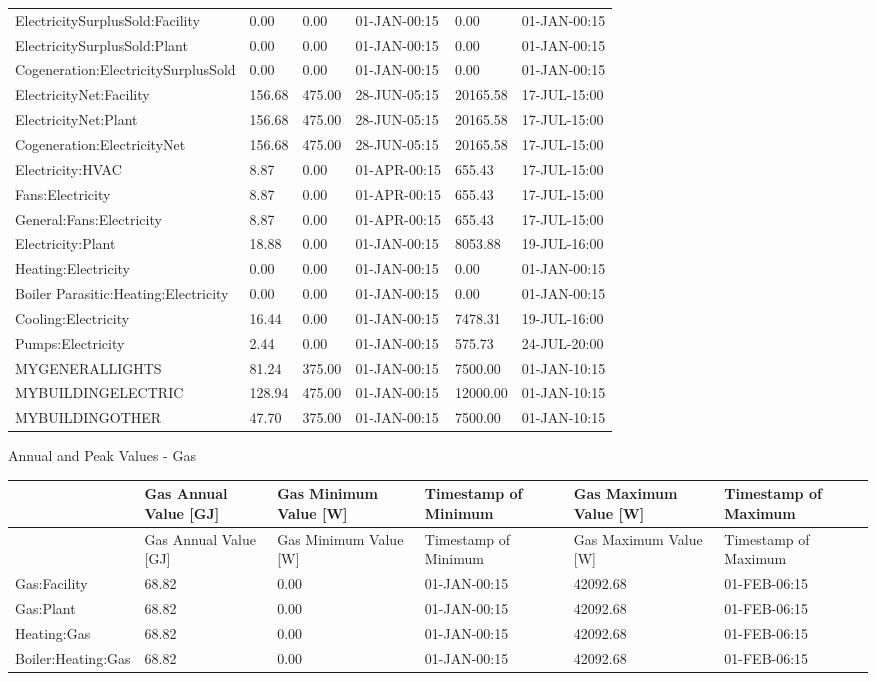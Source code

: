 {\begin{longtable}[c]{>{\raggedright}p{1.5in}>{\raggedright}p{0.9in}>{\raggedright}p{0.9in}>{\raggedright}p{0.9in}>{\raggedright}p{0.9in}>{\raggedright}p{0.9in}}
ElectricitySurplusSold\-:Facility & 0.00 & 0.00 & 01-JAN-00\-:15 & 0.00 & 01-JAN-00\-:15 \tabularnewline
ElectricitySurplusSold\-:Plant & 0.00 & 0.00 & 01-JAN-00\-:15 & 0.00 & 01-JAN-00\-:15 \tabularnewline
Cogeneration\-:ElectricitySurplusSold & 0.00 & 0.00 & 01-JAN-00\-:15 & 0.00 & 01-JAN-00\-:15 \tabularnewline
ElectricityNet\-:Facility & 156.68 & 475.00 & 28-JUN-05\-:15 & 20165.58 & 17-JUL-15\-:00 \tabularnewline
ElectricityNet\-:Plant & 156.68 & 475.00 & 28-JUN-05\-:15 & 20165.58 & 17-JUL-15\-:00 \tabularnewline
Cogeneration\-:ElectricityNet & 156.68 & 475.00 & 28-JUN-05\-:15 & 20165.58 & 17-JUL-15\-:00 \tabularnewline
Electricity\-:HVAC & 8.87 & 0.00 & 01-APR-00\-:15 & 655.43 & 17-JUL-15\-:00 \tabularnewline
Fans\-:Electricity & 8.87 & 0.00 & 01-APR-00\-:15 & 655.43 & 17-JUL-15\-:00 \tabularnewline
General\-:Fans\-:Electricity & 8.87 & 0.00 & 01-APR-00\-:15 & 655.43 & 17-JUL-15\-:00 \tabularnewline
Electricity\-:Plant & 18.88 & 0.00 & 01-JAN-00\-:15 & 8053.88 & 19-JUL-16\-:00 \tabularnewline
Heating\-:Electricity & 0.00 & 0.00 & 01-JAN-00\-:15 & 0.00 & 01-JAN-00\-:15 \tabularnewline
Boiler Parasitic\-:Heating\-:Electricity & 0.00 & 0.00 & 01-JAN-00\-:15 & 0.00 & 01-JAN-00\-:15 \tabularnewline
Cooling\-:Electricity & 16.44 & 0.00 & 01-JAN-00\-:15 & 7478.31 & 19-JUL-16\-:00 \tabularnewline
Pumps\-:Electricity & 2.44 & 0.00 & 01-JAN-00\-:15 & 575.73 & 24-JUL-20\-:00 \tabularnewline
MYGENERALLIGHTS & 81.24 & 375.00 & 01-JAN-00\-:15 & 7500.00 & 01-JAN-10\-:15 \tabularnewline
MYBUILDINGELECTRIC & 128.94 & 475.00 & 01-JAN-00\-:15 & 12000.00 & 01-JAN-10\-:15 \tabularnewline
MYBUILDINGOTHER & 47.70 & 375.00 & 01-JAN-00\-:15 & 7500.00 & 01-JAN-10\-:15 \tabularnewline
\bottomrule
\end{longtable}}

Annual and Peak Values - Gas

{\scriptsize
\begin{longtable}[c]{>{\raggedright}p{1.0in}>{\raggedright}p{1.0in}>{\raggedright}p{1.0in}>{\raggedright}p{1.0in}>{\raggedright}p{1.0in}>{\raggedright}p{1.0in}}
\toprule
 & Gas Annual Value [GJ] & Gas Minimum Value [W] & Timestamp of Minimum & Gas Maximum Value [W] & Timestamp of Maximum \tabularnewline
\midrule
\endfirsthead

\toprule
 & Gas Annual Value [GJ] & Gas Minimum Value [W] & Timestamp of Minimum & Gas Maximum Value [W] & Timestamp of Maximum \tabularnewline
\midrule
\endhead

Gas\-:Facility & 68.82 & 0.00 & 01-JAN-00\-:15 & 42092.68 & 01-FEB-06\-:15 \tabularnewline
Gas\-:Plant & 68.82 & 0.00 & 01-JAN-00\-:15 & 42092.68 & 01-FEB-06\-:15 \tabularnewline
Heating\-:Gas & 68.82 & 0.00 & 01-JAN-00\-:15 & 42092.68 & 01-FEB-06\-:15 \tabularnewline
Boiler\-:Heating\-:Gas & 68.82 & 0.00 & 01-JAN-00\-:15 & 42092.68 & 01-FEB-06\-:15 \tabularnewline
\bottomrule
\end{longtable}}

